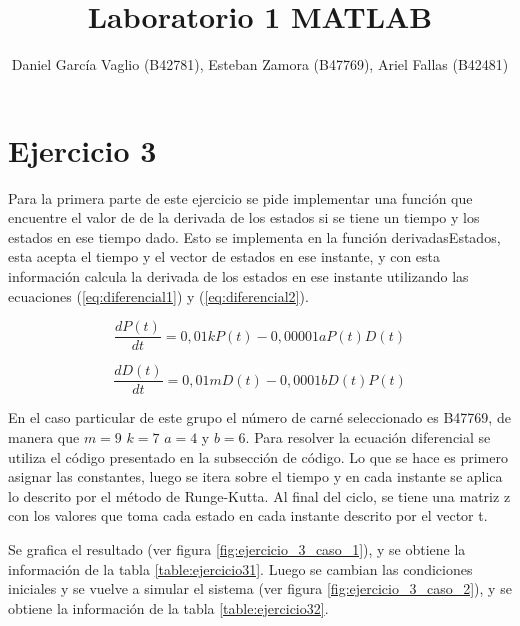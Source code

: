 \documentclass[12pt,letterpaper]{article}
\begin{document}
\title{Laboratorio 1 MATLAB}
\author{Daniel García Vaglio (B42781), Esteban Zamora (B47769), Ariel Fallas (B42481)}
\maketitle

\section{Ejercicio 3}

Para la primera parte de este ejercicio se pide implementar una función  que encuentre el valor de de la derivada de los estados si se tiene un tiempo y los estados en ese tiempo dado. Esto se implementa en la función derivadasEstados, esta acepta el tiempo y el vector de estados en ese instante, y con esta información calcula la derivada de los estados en ese instante utilizando las ecuaciones (\ref{eq:diferencial1}) y (\ref{eq:diferencial2}). 

\begin{equation}
\frac{dP(t)}{dt}=0,01kP(t)-0,00001aP(t)D(t)
\label{eq:diferencial1}
\end{equation}

\begin{equation}
\frac{dD(t)}{dt}=0,01mD(t)-0,0001bD(t)P(t)
\label{eq:diferencial2}
\end{equation}

En el caso particular de este grupo el número de carné seleccionado es B47769, de manera que $m=9$ $k=7$ $a=4$ y $b=6$. Para resolver la ecuación diferencial se utiliza el código presentado en la subsección de código. Lo que se hace es primero asignar las constantes, luego se itera sobre el tiempo y en cada instante se aplica lo descrito por el método de Runge-Kutta. Al final del ciclo, se tiene una matriz z con los valores que toma cada estado en cada instante descrito por el vector t. 

Se grafica el resultado (ver figura \ref{fig:ejercicio_3_caso_1}), y se obtiene la información de la tabla \ref{table:ejercicio31}. Luego se cambian las condiciones iniciales y se vuelve a simular el sistema (ver figura \ref{fig:ejercicio_3_caso_2}), y se obtiene la información de la tabla \ref{table:ejercicio32}.
\end{document}
